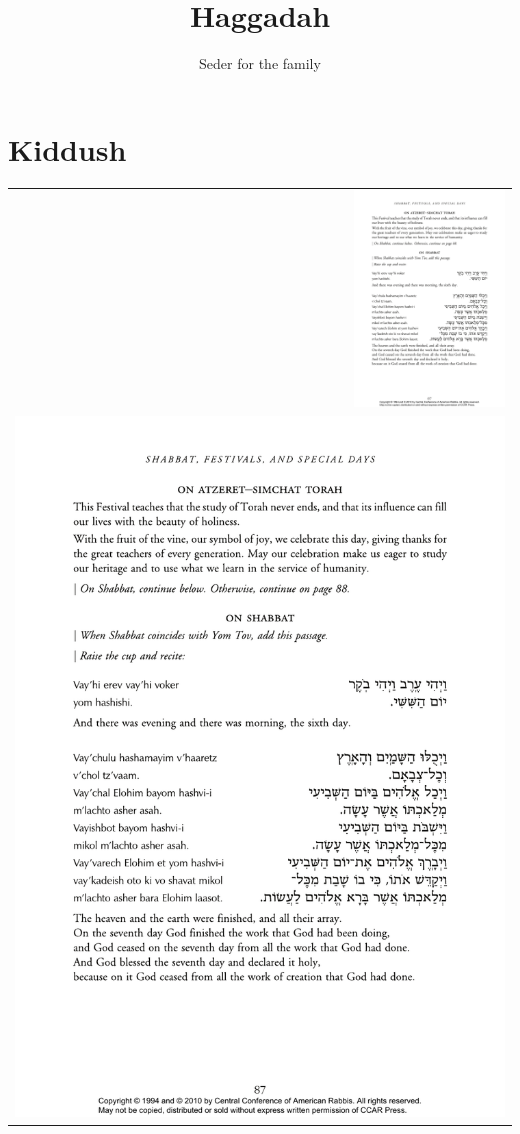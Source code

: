 \documentclass[12pt]{report}
\title{Haggadah}
\author{Seder for the family}
\begin{document}
\maketitle

\section*{Kiddush}

\begin{tabular}{r}
\includegraphics[width=4cm]{figs/0A010-vayehi}\\
\includegraphics[scale=1,trim=0mm 0mm 2mm 0mm,clip]{figs/0A014-vayechulu}\\
\end{tabular}
\end{document}
